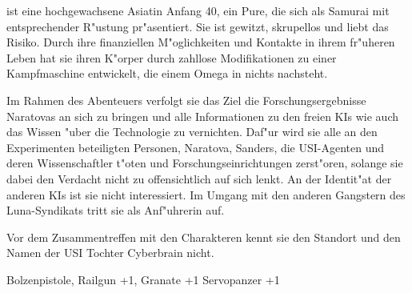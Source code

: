 \xl{} ist eine hochgewachsene Asiatin Anfang 40, ein Pure, die sich als Samurai mit entsprechender R"ustung pr"asentiert. Sie ist gewitzt, skrupellos und liebt das Risiko. Durch ihre finanziellen M"oglichkeiten und Kontakte in ihrem fr"uheren Leben hat sie ihren K"orper durch zahllose Modifikationen zu einer Kampfmaschine entwickelt, die einem Omega in nichts nachsteht.

Im Rahmen des Abenteuers verfolgt sie das Ziel die Forschungsergebnisse Naratovas an sich zu bringen und alle Informationen zu den freien KIs wie auch das Wissen "uber die Technologie zu vernichten. Daf"ur wird sie alle an den Experimenten beteiligten Personen, Naratova, Sanders, die USI-Agenten und deren Wissenschaftler t"oten und Forschungseinrichtungen zerst"oren, solange sie dabei den Verdacht nicht zu offensichtlich auf sich lenkt. An der Identit"at der anderen KIs ist sie nicht interessiert. Im Umgang mit den anderen Gangstern des Luna-Syndikats tritt sie als Anf"uhrerin auf.

Vor dem Zusammentreffen mit den Charakteren kennt sie den Standort und den Namen der USI Tochter Cyberbrain nicht.

\begin{nscsheet}[f]{\xls}
    \nscstats[ATT=3,AGG=3,DEX=2,COM=2,CON=2]
    \nscruler
    \begin{nscinventory}
        \nscitem[Waffen] Bolzenpistole, Railgun +1, Granate +1
        \nscitem[R"ustung] Servopanzer +1
    \end{nscinventory}
\end{nscsheet}

